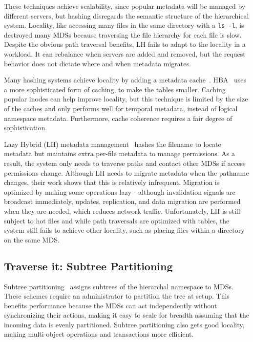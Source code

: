 These techniques achieve scalability, since popular metadata will be managed by different servers, but hashing disregards the semantic structure of the hierarchical system. Locality, like accessing many files in the same directory with a \texttt{ls -l}, is destroyed many MDSs because traversing the file hierarchy for each file is slow. Despite the obvious path traversal benefits, LH fails to adapt to the locality in a workload. It can rebalance when servers are added and removed, but the request behavior does not dictate where and when metadata migrates. 

Many hashing systems achieve locality by adding a metadata cache~\cite{li:msst2006-dynamic, xing:sc2009-skyfs}. HBA~\cite{zhu:pds2008-hba} uses a more sophisticated form of caching, to make the tables smaller. Caching popular inodes can help improve locality, but this technique is limited by the size of the caches and only performs well for temporal metadata, instead of logical namespace metadata. Furthermore, cache coherence requires a fair degree of sophistication.

Lazy Hybrid (LH) metadata management~\cite{brandt:mss2003-lh} hashes the filename to locate metadata but maintains extra per-file metadata to manage permissions. As a result, the system only needs to traverse paths and contact other MDSs if access permissions change. Although LH needs to migrate metadata when the pathname changes, their work shows that this is relatively infrequent. Migration is optimized by making some operations lazy - although invalidation signals are broadcast immediately, updates, replication, and data migration are performed when they are needed, which reduces network traffic. Unfortunately, LH is still subject to hot files and while path traversals are optimized with tables, the system still fails to achieve other  locality, such as placing files within a directory on the same MDS. 
 

\subsection{Traverse it: Subtree Partitioning}
Subtree partitioning~\cite{website:lustre,welch:fast2008-panasas} assigns subtrees of the hierarchal namespace to MDSs. These schemes require an administrator to partition the tree at setup. This benefits performance because the MDSs can act independently without synchronizing their actions, making it easy to scale for breadth assuming that the incoming data is evenly partitioned. Subtree partitioning also gets good locality, making multi-object operations and transactions more efficient. 

